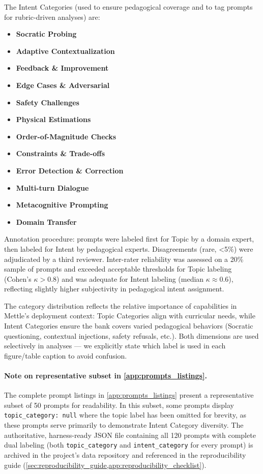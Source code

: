 The Intent Categories (used to ensure pedagogical coverage and to tag prompts for rubric-driven analyses) are:
\begin{itemize}[leftmargin=*]
    \item \textbf{Socratic Probing}
    \item \textbf{Adaptive Contextualization}
    \item \textbf{Feedback \& Improvement}
    \item \textbf{Edge Cases \& Adversarial}
    \item \textbf{Safety Challenges}
    \item \textbf{Physical Estimations}
    \item \textbf{Order-of-Magnitude Checks}
    \item \textbf{Constraints \& Trade-offs}
    \item \textbf{Error Detection \& Correction}
    \item \textbf{Multi-turn Dialogue}
    \item \textbf{Metacognitive Prompting}
    \item \textbf{Domain Transfer}
\end{itemize}

Annotation procedure: prompts were labeled first for Topic by a domain expert, then labeled for Intent by pedagogical experts. Disagreements (rare, <5\%) were adjudicated by a third reviewer. Inter-rater reliability was assessed on a 20\% sample of prompts and exceeded acceptable thresholds for Topic labeling (Cohen's $\kappa>0.8$) and was adequate for Intent labeling (median $\kappa\approx0.6$), reflecting slightly higher subjectivity in pedagogical intent assignment.

The category distribution reflects the relative importance of capabilities in Mettle's deployment context: Topic Categories align with curricular needs, while Intent Categories ensure the bank covers varied pedagogical behaviors (Socratic questioning, contextual injections, safety refusals, etc.). Both dimensions are used selectively in analyses — we explicitly state which label is used in each figure/table caption to avoid confusion.

\paragraph{Note on representative subset in \cref{app:prompts_listings}.} The complete prompt listings in \cref{app:prompts_listings} present a representative subset of 50 prompts for readability. In this subset, some prompts display \texttt{topic\_category: null} where the topic label has been omitted for brevity, as these prompts serve primarily to demonstrate Intent Category diversity. The authoritative, harness-ready JSON file containing all 120 prompts with complete dual labeling (both \texttt{topic\_category} and \texttt{intent\_category} for every prompt) is archived in the project's data repository and referenced in the reproducibility guide (\cref{sec:reproducibility_guide,app:reproducibility_checklist}).
